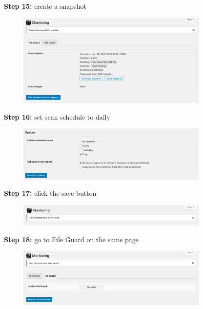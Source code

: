\documentclass[a4paper]{article}
\begin{document}
\noindent
\textbf{Step 15:} create a snapshot

\begin{figure}[H]
  \centering
  \includegraphics[width=0.85\textwidth]{images/16.png}
\end{figure}

\newpage

\noindent
\textbf{Step 16:} set scan schedule to daily

\begin{figure}[H]
  \centering
  \includegraphics[width=0.85\textwidth]{images/17.png}
\end{figure}

\noindent
\textbf{Step 17:} click the save button

\begin{figure}[H]
  \centering
  \includegraphics[width=0.85\textwidth]{images/18.png}
\end{figure}

\noindent
\textbf{Step 18:} go to File Guard on the same page

\begin{figure}[H]
  \centering
  \includegraphics[width=0.85\textwidth]{images/19.png}
\end{figure}
\end{document}
